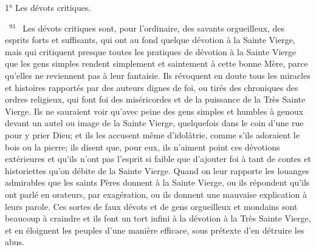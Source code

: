 \documentclass[paper=a5,pagesize=pdftex,fontsize=15pt,headinclude=on,twoside=off]{scrbook}
\newcommand{\negphantom}[1]{\settowidth{\dimen0}{#1}\hspace*{-\dimen0}}
\newcommand{\versenb}[1]{\par \vspace{10pt}~\negphantom{~${}^{#1}$~}${}^{#1}$~}
\begin{document}
1° Les dévots critiques.
\versenb{93} Les dévots critiques sont, pour l'ordinaire, des savants orgueilleux, des esprits forts et suffisants, qui ont au
fond quelque dévotion à la Sainte Vierge, mais qui critiquent presque toutes les pratiques de dévotion à la Sainte
Vierge que les gens simples rendent simplement et saintement à cette bonne Mère, parce qu'elles ne reviennent
pas à leur fantaisie. Ils révoquent en doute tous les miracles et histoires rapportés par des auteurs dignes de foi,
ou tirés des chroniques des ordres religieux, qui font foi des miséricordes et de la puissance de la Très Sainte
Vierge. Ils ne sauraient voir qu'avec peine des gens simples et humbles à genoux devant un autel ou image de la
Sainte Vierge, quelquefois dans le coin d'une rue pour y prier Dieu; et ils les accusent même d'idolâtrie, comme
s'ils adoraient le bois ou la pierre; ils disent que, pour eux, ils n'aiment point ces dévotions extérieures et qu'ils
n'ont pas l'esprit si faible que d'ajouter foi à tant de contes et historiettes qu'on débite de la Sainte Vierge. Quand
on leur rapporte les louanges admirables que les saints Pères donnent à la Sainte Vierge, ou ils répondent qu'ils
ont parlé en orateurs, par exagération, ou ils donnent une mauvaise explication à leurs parole.
Ces sortes de faux dévots et de gens orgueilleux et mondains sont beaucoup à craindre et ils font un tort infini à la
dévotion à la Très Sainte Vierge, et en éloignent les peuples d'une manière efficace, sous prétexte d'en détruire les
abus.
\end{document}
